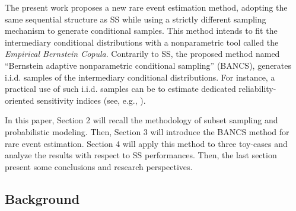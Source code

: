 
The present work proposes a new rare event estimation method, adopting the same sequential structure as SS while using a strictly different sampling mechanism to generate conditional samples. 
This method intends to fit the intermediary conditional distributions with a nonparametric tool called the \emph{Empirical Bernstein Copula}. 
Contrarily to SS, the proposed method named ``Bernstein adaptive nonparametric conditional sampling'' (BANCS), generates i.i.d. samples of the intermediary conditional distributions. 
For instance, a practical use of such i.i.d. samples can be to estimate dedicated reliability-oriented sensitivity indices (see, e.g., \cite{chabridon2021global,marrel_chabridon_2021}).

In this paper, Section 2 will recall the methodology of subset sampling and probabilistic modeling. 
Then, Section 3 will introduce the BANCS method for rare event estimation. 
Section 4 will apply this method to three toy-cases and analyze the results with respect to SS performances. 
Then, the last section present some conclusions and research perspectives.


\subsection{Background}

